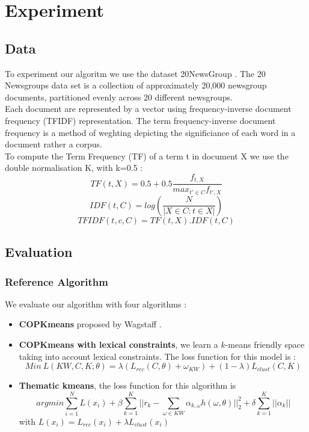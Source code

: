 \section{Experiment}

\subsection{Data}
To experiment our algoritm we use the dataset 20NewsGroup \cite{Newsgroups20}.
The 20 Newsgroups data set is a collection of approximately 20,000 newsgroup 
documents, partitioned evenly across 20 different newsgroups.\\
Each document are represented by a vector using frequency-inverse document 
frequency (TFIDF) representation.
The term frequency-inverse document frequency is a method of weghting depicting 
the significiance of each word in a document rather a corpus.
\\To compute the Term 
Frequency (TF) of a term t in document X we use the double normalisation K, 
with k=0.5 :
\begin{equation}
TF(t, X) = 0.5 + 0.5\frac{f_{t, X}}{max_{t' \in C}f_{t', X}} 
\end{equation}
\begin{equation}
IDF(t, C) = log(\frac{N}{|X \in C : t \in X|})
\end{equation}
\begin{equation}
TFIDF(t,c,C) = TF(t, X) . IDF(t, C)   
\end{equation}
\subsection{Evaluation}
\subsubsection{Reference Algorithm}
We evaluate our algorithm with four algorithms :
\begin{itemize}
\item \textbf{COPKmeans} proposed by Wagstaff \cite{Wagstaff:2001:CKC:645530.655669}.
\item \textbf{COPKmeans with lexical constraints}, we learn a $k$-means
  friendly space taking into account lexical constraints. The loss
  function for this model is :
  $$
  Min~L(KW, C, K; \theta) = \lambda(L_{rec}(C, \theta) + \omega_{KW} )+
  (1-\lambda)L_{clust}(C,K)
  $$
\item \textbf{Thematic kmeans}, the loss function for this algorithm is
  \begin{equation*}
    argmin \sum_{i=1}^{N}L(x_i) + \beta\sum_{k=1}^{K}||r_k - \sum_{\omega \in KW}
    \alpha_{k,\omega}h(\omega, \theta)||_2^2 + \delta\sum_{k=1}^{K}||\alpha_k|| 
  \end{equation*}
  with $L(x_i) = L_{rec}(x_i) + \lambda L_{clust}(x_i)$
\end{itemize}
